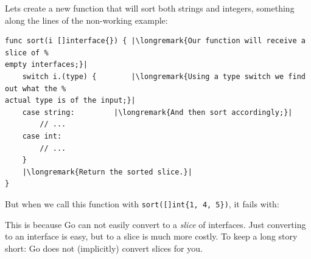 Lets create a new function that will sort both strings and
integers, something along the lines of the non-working example:
\begin{lstlisting}
func sort(i []interface{}) { |\longremark{Our function will receive a slice of %
empty interfaces;}|
    switch i.(type) {        |\longremark{Using a type switch we find out what the %
actual type is of the input;}|
	case string:         |\longremark{And then sort accordingly;}|
	    // ...
	case int:
	    // ...
    }
    |\longremark{Return the sorted slice.}|
}
\end{lstlisting}
\showremarks
But when we call this function with \lstinline|sort([]int{1, 4, 5})|, it
fails with:

This is because Go can not easily convert to a \emph{slice} of interfaces.
Just converting to an interface is easy, but to a slice is much more costly.
To keep a 
long story short: Go does not (implicitly) convert slices for you.

